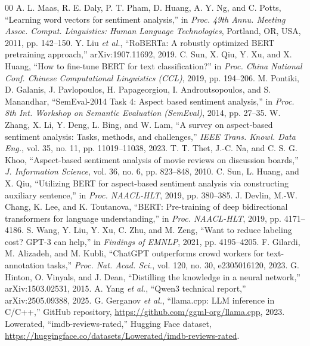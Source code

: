 \documentclass[conference]{IEEEtran}
\begin{document}
\begin{thebibliography}{00}
 A. L. Maas, R. E. Daly, P. T. Pham, D. Huang, A. Y. Ng, and C. Potts, ``Learning word vectors for sentiment analysis,'' in \textit{Proc. 49th Annu. Meeting Assoc. Comput. Linguistics: Human Language Technologies}, Portland, OR, USA, 2011, pp. 142--150.
 Y. Liu \textit{et al.}, ``RoBERTa: A robustly optimized BERT pretraining approach,'' arXiv:1907.11692, 2019.
 C. Sun, X. Qiu, Y. Xu, and X. Huang, ``How to fine-tune BERT for text classification?'' in \textit{Proc. China National Conf. Chinese Computational Linguistics (CCL)}, 2019, pp. 194--206.
 M. Pontiki, D. Galanis, J. Pavlopoulos, H. Papageorgiou, I. Androutsopoulos, and S. Manandhar, ``SemEval-2014 Task 4: Aspect based sentiment analysis,'' in \textit{Proc. 8th Int. Workshop on Semantic Evaluation (SemEval)}, 2014, pp. 27--35.
 W. Zhang, X. Li, Y. Deng, L. Bing, and W. Lam, ``A survey on aspect-based sentiment analysis: Tasks, methods, and challenges,'' \textit{IEEE Trans. Knowl. Data Eng.}, vol. 35, no. 11, pp. 11019--11038, 2023.
 T. T. Thet, J.-C. Na, and C. S. G. Khoo, ``Aspect-based sentiment analysis of movie reviews on discussion boards,'' \textit{J. Information Science}, vol. 36, no. 6, pp. 823--848, 2010.
 C. Sun, L. Huang, and X. Qiu, ``Utilizing BERT for aspect-based sentiment analysis via constructing auxiliary sentence,'' in \textit{Proc. NAACL-HLT}, 2019, pp. 380--385.
 J. Devlin, M.-W. Chang, K. Lee, and K. Toutanova, ``BERT: Pre-training of deep bidirectional transformers for language understanding,'' in \textit{Proc. NAACL-HLT}, 2019, pp. 4171--4186.
 S. Wang, Y. Liu, Y. Xu, C. Zhu, and M. Zeng, ``Want to reduce labeling cost? GPT-3 can help,'' in \textit{Findings of EMNLP}, 2021, pp. 4195--4205.
 F. Gilardi, M. Alizadeh, and M. Kubli, ``ChatGPT outperforms crowd workers for text-annotation tasks,'' \textit{Proc. Nat. Acad. Sci.}, vol. 120, no. 30, e2305016120, 2023.
 G. Hinton, O. Vinyals, and J. Dean, ``Distilling the knowledge in a neural network,'' arXiv:1503.02531, 2015.
 A. Yang \textit{et al.}, ``Qwen3 technical report,'' arXiv:2505.09388, 2025.
 G. Gerganov \textit{et al.}, ``llama.cpp: LLM inference in C/C++,'' GitHub repository, \url{https://github.com/ggml-org/llama.cpp}, 2023.
 Lowerated, ``imdb-reviews-rated,'' Hugging Face dataset, \url{https://huggingface.co/datasets/Lowerated/imdb-reviews-rated}.

\end{thebibliography}
\end{document}

